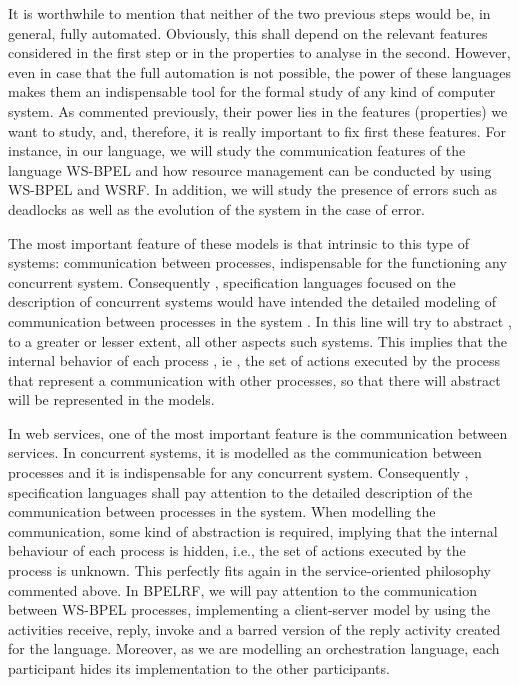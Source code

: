 It is worthwhile to mention that neither of the two previous steps would be, in general, fully automated.
Obviously, this shall depend on the relevant features considered in the first
step or in the properties to analyse in the second. However, even in case that the full automation is not possible, 
the power of these languages makes them an indispensable tool for the formal study of any kind of computer system. 
As commented previously, their power lies in the features (properties) we want to study, and, therefore, it is really
important to fix first these features. For instance, in our language, we will study the communication features of the language 
WS-BPEL and how resource management can be conducted by using WS-BPEL and WSRF. In addition, we will study the presence of errors such as deadlocks
as well as the evolution of the system in the case of error. 

The most important feature of these models is that intrinsic to this type of systems:
communication between processes, indispensable for the functioning
any concurrent system.
Consequently , specification languages 
focused on the description
of concurrent systems would have intended the detailed modeling
of communication between processes in the system . In this line
will try to abstract , to a greater or lesser extent, all other aspects
such systems. This implies that the internal behavior of each
process , ie , the set of actions executed by the process that
represent a communication with other processes, so that there will abstract
will be represented in the models.

In web services, one of the most important feature is the communication between services. In concurrent systems,
it is modelled as the communication between processes and it is indispensable for any concurrent system.
Consequently , specification languages shall pay attention to the detailed description
of the communication between processes in the system. When modelling the communication, 
some kind of abstraction is required, implying that the internal behaviour of each
process is hidden, i.e., the set of actions executed by the process is unknown. This perfectly fits again in the service-oriented
philosophy commented above. In BPELRF, we will pay attention to the communication between WS-BPEL processes, implementing a client-server
model by using the activities receive, reply, invoke and a barred version of the reply activity created for the language. Moreover, as we are modelling
an orchestration language, each participant hides its implementation to the other participants.  

